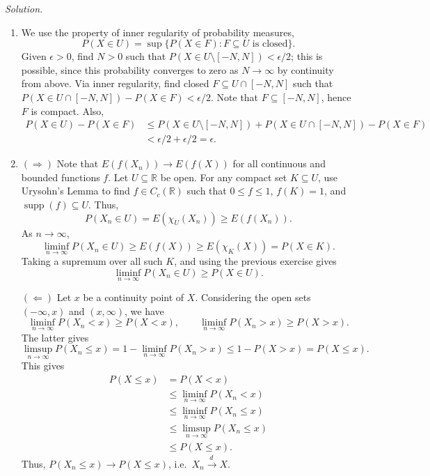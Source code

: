 \documentclass[10pt]{article}
\newcounter{prob}
\newcommand{\solution}{\textit{Solution.} }
\newcommand{\R}{\mathbb{R}}
\newcommand{\tod}{\overset{d\,}{\longrightarrow}}
\begin{document}
    \solution \begin{enumerate}
        \item We use the property of inner regularity of probability measures, \[
            P(X \in U) = \sup \{P(X \in F) : F \subseteq U \text{ is closed}\}.
        \] Given $\epsilon > 0$, find $N > 0$ such that $P(X \in U \setminus[-N, N])
        < \epsilon / 2$; this is possible, since this probability converges to zero
        as $N \to \infty$ by continuity from above. Via inner regularity, find closed
        $F \subseteq U\cap [-N, N]$ such that $P(X \in U\cap [-N, N]) - P(X \in F) <
        \epsilon / 2$. Note that $F \subseteq [-N, N]$, hence $F$ is compact. Also,
        \begin{align*}
            P(X \in U) - P(X \in F) &\leq P(X \in U \setminus [-N, N]) + P(X \in U
            \cap [-N, N]) - P(X \in F) \\
            &< \epsilon / 2 + \epsilon / 2 = \epsilon.
        \end{align*}

        \item $(\Rightarrow)$ Note that $E(f(X_n)) \to E(f(X))$ for all continuous
        and bounded functions $f$. Let $U \subseteq \R$ be open. For any compact set
        $K \subseteq U$, use Urysohn's Lemma to find $f \in C_c(\R)$ such that $0
        \leq f \leq 1$, $f(K) = 1$, and $\operatorname{supp}(f) \subseteq U$. Thus,
        \[
            P(X_n \in U) = E(\chi_U(X_n)) \geq E(f(X_n)).
        \] As $n \to \infty$, \[
            \liminf_{n \to \infty} P(X_n \in U) \geq E(f(X)) \geq E(\chi_K(X)) = P(X
            \in K).
        \] Taking a supremum over all such $K$, and using the previous exercise gives
        \[
            \liminf_{n \to \infty} P(X_n \in U) \geq P(X \in U).
        \]

        $(\Leftarrow)$ Let $x$ be a continuity point of $X$. Considering the open
        sets $(-\infty, x)$ and $(x, \infty)$, we have \[
            \liminf_{n \to \infty} P(X_n < x) \geq P(X < x), \qquad
            \liminf_{n \to \infty} P(X_n > x) \geq P(X > x).
        \] The latter gives \[
            \limsup_{n \to \infty} P(X_n \leq x) = 1 - \liminf_{n \to \infty} P(X_n >
            x) \leq 1 - P(X > x) = P(X \leq x).
        \] This gives \begin{align*}
            P(X \leq x) &= P(X < x) \\
            &\leq \liminf_{n \to \infty} P(X_n < x) \\
            &\leq \liminf_{n \to \infty} P(X_n \leq x) \\
            &\leq \limsup_{n \to \infty} P(X_n \leq x) \\
            &\leq P(X \leq x).
        \end{align*}
        Thus, $P(X_n \leq x) \to P(X \leq x)$, i.e.\ $X_n \tod X$.


\end{enumerate}
\end{document}
